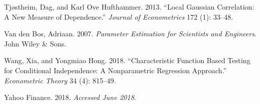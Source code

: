 \documentclass[
  12pt,
  letterpaper]{article}
\numberwithin{equation}{section}
\newlength{\cslhangindent}
\newenvironment{cslreferences}%
  {\setlength{\parindent}{0pt}%
  \everypar{\setlength{\hangindent}{\cslhangindent}}\ignorespaces}%
  {\par}
\begin{document}
\begin{cslreferences}
\leavevmode\hypertarget{ref-tjostheim2013local}{}%
Tjøstheim, Dag, and Karl Ove Hufthammer. 2013. ``Local Gaussian Correlation: A New Measure of Dependence.'' \emph{Journal of Econometrics} 172 (1): 33--48.

\leavevmode\hypertarget{ref-van2007parameter}{}%
Van den Bos, Adriaan. 2007. \emph{Parameter Estimation for Scientists and Engineers}. John Wiley \& Sons.

\leavevmode\hypertarget{ref-wang2017characteristic}{}%
Wang, Xia, and Yongmiao Hong. 2018. ``Characteristic Function Based Testing for Conditional Independence: A Nonparametric Regression Approach.'' \emph{Econometric Theory} 34 (4): 815--49.

\leavevmode\hypertarget{ref-yahoo}{}%
Yahoo Finance. 2018. \emph{Accessed June 2018}.
\end{cslreferences}
\end{document}

